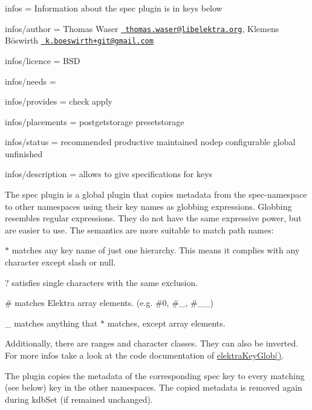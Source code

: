 
\begin{DoxyItemize}
\item infos = Information about the spec plugin is in keys below
\item infos/author = Thomas Waser \href{mailto:thomas.waser@libelektra.org}{\texttt{ thomas.\+waser@libelektra.\+org}}, Klemens Böswirth \href{mailto:k.boeswirth+git@gmail.com}{\texttt{ k.\+boeswirth+git@gmail.\+com}}
\item infos/licence = B\+SD
\item infos/needs =
\item infos/provides = check apply
\item infos/placements = postgetstorage presetstorage
\item infos/status = recommended productive maintained nodep configurable global unfinished
\item infos/description = allows to give specifications for keys
\end{DoxyItemize}

The spec plugin is a global plugin that copies metadata from the {\ttfamily spec}-\/namespace to other namespaces using their key names as globbing expressions. Globbing resembles regular expressions. They do not have the same expressive power, but are easier to use. The semantics are more suitable to match path names\+:


\begin{DoxyItemize}
\item {\ttfamily $\ast$} matches any key name of just one hierarchy. This means it complies with any character except slash or null.
\item {\ttfamily ?} satisfies single characters with the same exclusion.
\item {\ttfamily \#} matches Elektra array elements. (e.\+g. {\ttfamily \#0}, {\ttfamily \#\+\_}, {\ttfamily \#\+\_\+\+\_})
\item {\ttfamily \+\_\+} matches anything that {\ttfamily $\ast$} matches, except array elements.
\item Additionally, there are ranges and character classes. They can also be inverted. For more infos take a look at the code documentation of {\ttfamily \mbox{\hyperlink{globbing_8c_ad7700821df72fc0fc3bfc336e4368d29}{elektra\+Key\+Glob()}}}.
\end{DoxyItemize}

The plugin copies the metadata of the corresponding {\ttfamily spec} key to every matching (see below) key in the other namespaces. The copied metadata is removed again during {\ttfamily kdb\+Set} (if remained unchanged).

